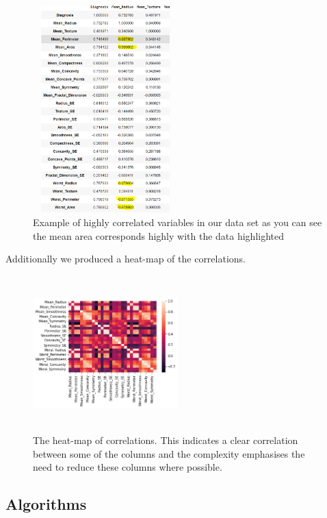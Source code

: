 \documentclass[conference]{IEEEtran}
\begin{document}
\begin{figure}[H]
\caption{Example of highly correlated variables in our data set as you can see the mean area corresponds highly with the data highlighted}
\centering
\includegraphics[height=80mm,width=0.5\textwidth]{dataset_correlation.PNG}
\end{figure}
Additionally we produced a heat-map of the correlations.
\begin{figure}[H]
\caption{The heat-map of correlations. This indicates a clear correlation between some of the columns and the complexity emphasises the need to reduce these columns where possible.}
\centering
\includegraphics[height=60mm,width=0.5\textwidth]{correlation_heatmap.PNG}
\end{figure}
\subsection{Algorithms}
\end{document}
